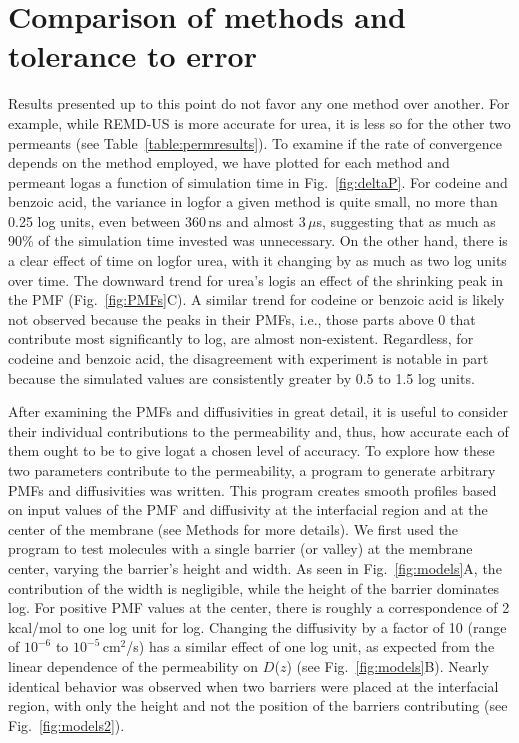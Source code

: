 \section{Comparison of methods and tolerance to error}
\par Results presented up to this point do not favor any one method over another.  For example, while REMD-US is more accurate for urea, it is less so for the other two permeants (see Table~\ref{table:permresults}).  To examine if the rate of convergence depends on the method employed, we have plotted for each method and permeant log\perm as a function of simulation time in Fig.~\ref{fig:deltaP}.  For codeine and benzoic acid, the variance in log\perm for a given method is quite small, no more than 0.25 log units, even between 360\,ns and almost 3\,$\mu$s, suggesting that as much as 90\% of the simulation time invested was unnecessary.  On the other hand, there is a clear effect of time on log\perm for urea, with it changing by as much as two log units over time.   The downward trend for urea's log\perm is an effect of the shrinking peak in the PMF (Fig.~\ref{fig:PMFs}C).   A similar trend for codeine or benzoic acid is likely not observed because the peaks in their PMFs, i.e., those parts above 0 that contribute most significantly to log\perm, are almost non-existent.   Regardless, for codeine and benzoic acid, the disagreement with experiment is notable in part because the simulated values are consistently greater by 0.5 to 1.5 log units.


\par After examining the PMFs and diffusivities in great detail, it is useful to consider their individual contributions to the permeability and, thus, how accurate each of them ought to be to give log\perm at a chosen level of accuracy.  To explore how these two parameters contribute to the permeability, a program to generate arbitrary PMFs and diffusivities was written.  This program creates smooth profiles based on input values of the PMF and diffusivity at the interfacial region and at the center of the membrane (see Methods for more details).  We first used the program to test molecules with a single barrier (or valley) at the membrane center, varying the barrier's height and width.  As seen in Fig.~\ref{fig:models}A, the contribution of the width is negligible, while the height of the barrier dominates log\perm.  For positive PMF values
at the center, there is roughly a correspondence of 2\,kcal/mol to one log unit for log\perm.  Changing the diffusivity by a factor of 10 (range of $10^{-6}$ to $10^{-5}$\,cm$^2$/s) has a similar effect of one log unit, as expected from the linear dependence of the permeability on $D$($z$) (see Fig.~\ref{fig:models}B).  Nearly identical behavior was observed when two barriers were placed at the interfacial region, with only the height and not the position of the barriers contributing (see Fig.~\ref{fig:models2}).

